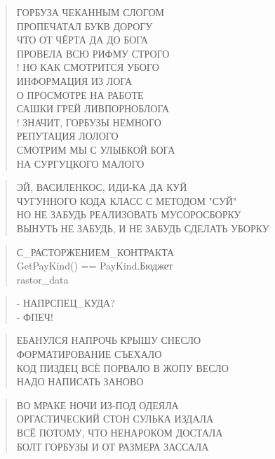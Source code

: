 \poemtitle{***}
\begin{verse}
ГОРБУЗА ЧЕКАННЫМ СЛОГОМ\\
ПРОПЕЧАТАЛ БУКВ ДОРОГУ\\
ЧТО ОТ ЧЁРТА ДА ДО БОГА\\
ПРОВЕЛА ВСЮ РИФМУ СТРОГО\\!
НО КАК СМОТРИТСЯ УБОГО\\
ИНФОРМАЦИЯ ИЗ ЛОГА\\
О ПРОСМОТРЕ НА РАБОТЕ\\
САШКИ ГРЕЙ ЛИВПОРНОБЛОГА\\!
ЗНАЧИТ, ГОРБУЗЫ НЕМНОГО\\
РЕПУТАЦИЯ ЛОЛОГО\\
СМОТРИМ МЫ С УЛЫБКОЙ БОГА\\
НА СУРГУЦКОГО МАЛОГО
\end{verse}

\poemtitle{***}
\begin{verse}
ЭЙ, ВАСИЛЕНКОС, ИДИ-КА ДА КУЙ\\
ЧУГУННОГО КОДА КЛАСС С МЕТОДОМ "СУЙ"\\
НО НЕ ЗАБУДЬ РЕАЛИЗОВАТЬ МУСОРОСБОРКУ\\
ВЫНУТЬ НЕ ЗАБУДЬ, И НЕ ЗАБУДЬ СДЕЛАТЬ УБОРКУ
\end{verse}

\poemtitle{***}
\begin{verse}
С\_РАСТОРЖЕНИЕМ\_КОНТРАКТА\\
GetPayKind() == PayKind.Бюджет\\
rastor\_data
\end{verse}

\poemtitle{***}
\begin{verse}
- НАПРСПЕЦ\_КУДА?\\
- ФПЕЧ!
\end{verse}

\poemtitle{***}
\begin{verse}
ЕБАНУЛСЯ НАПРОЧЬ КРЫШУ СНЕСЛО\\
ФОРМАТИРОВАНИЕ СЪЕХАЛО\\
КОД ПИЗДЕЦ ВСЁ ПОРВАЛО В ЖОПУ ВЕСЛО\\
НАДО НАПИСАТЬ ЗАНОВО
\end{verse}

\poemtitle{***}
\begin{verse}
ВО МРАКЕ НОЧИ ИЗ-ПОД ОДЕЯЛА\\
ОРГАСТИЧЕСКИЙ СТОН СУЛЬКА ИЗДАЛА\\
ВСЁ ПОТОМУ, ЧТО НЕНАРОКОМ ДОСТАЛА\\
БОЛТ ГОРБУЗЫ И ОТ РАЗМЕРА ЗАССАЛА
\end{verse}

